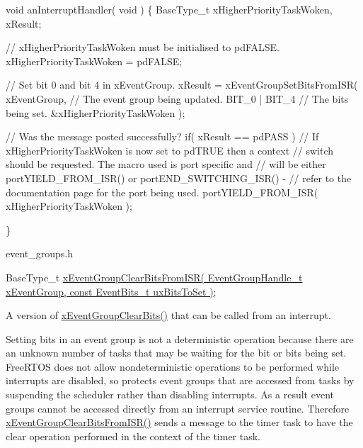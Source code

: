 \begin{DoxyPre}  void anInterruptHandler( void )
  \{
  BaseType\_t xHigherPriorityTaskWoken, xResult;
\begin{DoxyVerb} // xHigherPriorityTaskWoken must be initialised to pdFALSE.
 xHigherPriorityTaskWoken = pdFALSE;

 // Set bit 0 and bit 4 in xEventGroup.
 xResult = xEventGroupSetBitsFromISR(
                     xEventGroup,    // The event group being updated.
                     BIT_0 | BIT_4   // The bits being set.
                     &xHigherPriorityTaskWoken );

 // Was the message posted successfully?
 if( xResult == pdPASS )
 {
     // If xHigherPriorityTaskWoken is now set to pdTRUE then a context
     // switch should be requested.  The macro used is port specific and
     // will be either portYIELD_FROM_ISR() or portEND_SWITCHING_ISR() -
     // refer to the documentation page for the port being used.
     portYIELD_FROM_ISR( xHigherPriorityTaskWoken );
 }
\end{DoxyVerb}

  \}
  \end{DoxyPre}


event\+\_\+groups.\+h 
\begin{DoxyPre}
   BaseType\_t \hyperlink{vendor_2ceedling_2plugins_2freertos_2src_2freertos_2include_2event__groups_8h_a3d7de214a697f33fe7b914e26a93f33a}{xEventGroupClearBitsFromISR( EventGroupHandle\_t xEventGroup, const EventBits\_t uxBitsToSet )};
\end{DoxyPre}


A version of \hyperlink{externals_2freertos_2include_2event__groups_8h_a0fb72cfdd4f0d5f86d955fc3af448f2a}{x\+Event\+Group\+Clear\+Bits()} that can be called from an interrupt.

Setting bits in an event group is not a deterministic operation because there are an unknown number of tasks that may be waiting for the bit or bits being set. Free\+R\+T\+OS does not allow nondeterministic operations to be performed while interrupts are disabled, so protects event groups that are accessed from tasks by suspending the scheduler rather than disabling interrupts. As a result event groups cannot be accessed directly from an interrupt service routine. Therefore \hyperlink{vendor_2ceedling_2plugins_2freertos_2src_2freertos_2include_2event__groups_8h_a3d7de214a697f33fe7b914e26a93f33a}{x\+Event\+Group\+Clear\+Bits\+From\+I\+S\+R()} sends a message to the timer task to have the clear operation performed in the context of the timer task.


